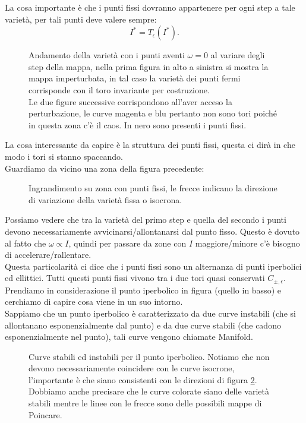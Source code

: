 La cosa importante è che i punti fissi dovranno appartenere per ogni step a tale varietà, per tali punti deve valere sempre:
\[
    I^* = T_{\epsilon}(I^*)
.\] 
\begin{figure}[H]
    \centering
    \caption{\scriptsize Andamento della varietà con i punti aventi $\omega =0$ al variare degli step della mappa, nella prima figura in alto a sinistra si mostra la mappa imperturbata, in tal caso la varietà dei punti fermi corrisponde con il toro invariante per costruzione.\\
    Le due figure successive corrispondono all'aver acceso la perturbazione, le curve magenta e blu pertanto non sono tori poiché in questa zona c'è il caos. In nero sono presenti i punti fissi.}
    \label{fig:19_tori_step}
\end{figure}
\noindent
La cosa interessante da capire è la struttura dei punti fissi, questa ci dirà in che modo i tori si stanno spaccando. \\
Guardiamo da vicino una zona della figura precedente: 
\begin{figure}[H]
    \centering
    \caption{\scriptsize Ingrandimento su zona con punti fissi, le frecce indicano la direzione di variazione della varietà fissa o isocrona.}
    \label{fig:19_tori_ingrandimento}
\end{figure}
\noindent
Possiamo vedere che tra la varietà del primo step e quella del secondo i punti devono necessariamente avvicinarsi/allontanarsi dal punto fisso. Questo è dovuto al fatto che $\omega \propto I$, quindi per passare da zone con $I$ maggiore/minore c'è bisogno di accelerare/rallentare.\\
Questa particolarità ci dice che i punti fissi sono un alternanza di punti iperbolici ed ellittici. Tutti questi punti fissi vivono tra i due tori quasi conservati $C_{\pm, \epsilon}$.\\
Prendiamo in considerazione il punto iperbolico in figura (quello in basso) e cerchiamo di capire cosa viene in un suo intorno.\\
Sappiamo che un punto iperbolico è caratterizzato da due curve instabili (che si allontanano esponenzialmente dal punto) e da due curve stabili (che cadono esponenzialmente nel punto), tali curve vengono chiamate Manifold.
\begin{figure}[H]
    \centering
    \caption{\scriptsize Curve stabili ed instabili per il punto iperbolico. Notiamo che non devono necessariamente coincidere con le curve isocrone, l'importante è che siano consistenti con le direzioni di figura \ref{fig:19_tori_ingrandimento}.\\
    Dobbiamo anche precisare che le curve colorate siano delle varietà stabili mentre le linee con le frecce sono delle possibili mappe di Poincare.}
    \label{fig:19_stab_instab}
\end{figure}
